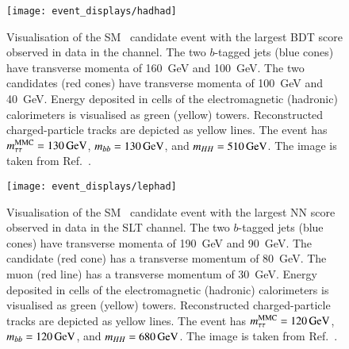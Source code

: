 \begin{figure}[htbp]
  \centering

  \texttt{[image: event\_displays/hadhad]}

  \caption[Visualisation of the SM~\HH candidate event with the largest BDT
  score observed in data in the \hadhad channel.]{Visualisation of the SM~\HH
    candidate event with the largest BDT score observed in data in the \hadhad
    channel. The two $b$-tagged jets (blue cones) have transverse momenta of
    \SI{160}{\GeV} and \SI{100}{\GeV}. The two \tauhadvis candidates (red cones)
    have transverse momenta of \SI{100}{\GeV} and \SI{40}{\GeV}. Energy
    deposited in cells of the electromagnetic (hadronic) calorimeters is
    visualised as green (yellow) towers. Reconstructed charged-particle tracks
    are depicted as yellow lines. The event has $m_{\tau\tau}^\text{MMC} = \SI{130}{\ensuremath{\text{GeV}}}$,
    $\mBB = \SI{130}{\GeV}$, and $m_{HH} = \SI{510}{\ensuremath{\text{GeV}}}$. The image is taken
    from Ref.~\cite{HDBS-2018-40}.}%
  \label{fig:event_display_hadhad}
\end{figure}


\begin{figure}[htbp]
  \centering

  \texttt{[image: event\_displays/lephad]}

  \caption[Visualisation of the SM~\HH candidate event with the largest NN score
  observed in data in the \lephad SLT channel.]{Visualisation of the SM~\HH
    candidate event with the largest NN score observed in data in the \lephad
    SLT channel. The two $b$-tagged jets (blue cones) have transverse momenta of
    \SI{190}{\GeV} and \SI{90}{\GeV}. The \tauhadvis candidate (red cone) has a
    transverse momentum of \SI{80}{\GeV}. The muon (red line) has a transverse
    momentum of \SI{30}{\GeV}. Energy deposited in cells of the electromagnetic
    (hadronic) calorimeters is visualised as green (yellow)
    towers. Reconstructed charged-particle tracks are depicted as yellow
    lines. The event has $m_{\tau\tau}^\text{MMC} = \SI{120}{\ensuremath{\text{GeV}}}$, $\mBB = \SI{120}{\GeV}$, and
    $m_{HH} = \SI{680}{\ensuremath{\text{GeV}}}$. The image is taken from Ref.~\cite{HDBS-2018-40}.}%
  \label{fig:event_display_lephad}
\end{figure}

